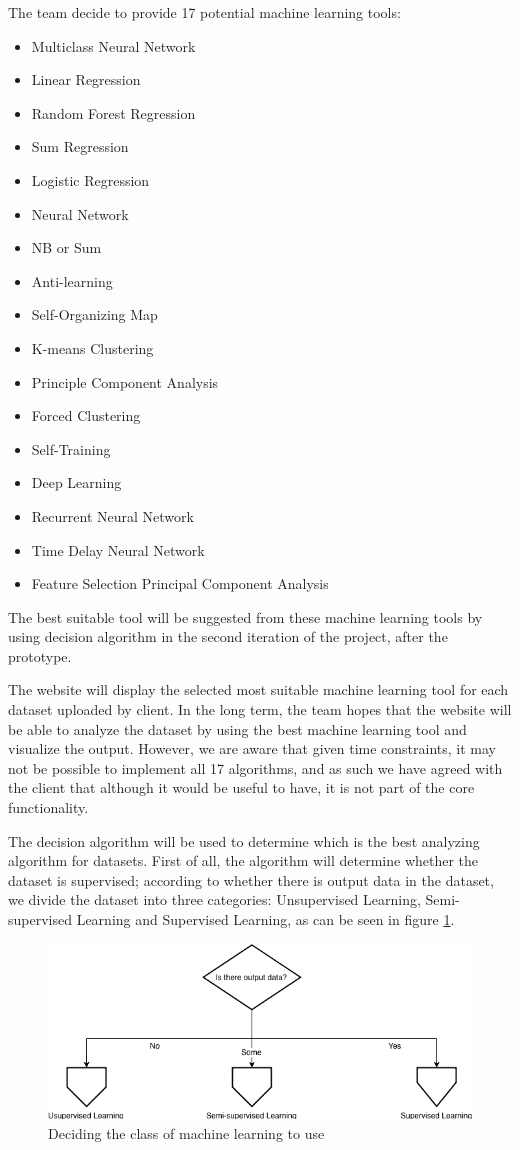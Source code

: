 \documentclass[titlepage]{article}
\begin{document}
The team decide to provide 17 potential machine learning tools:
\begin{itemize}
  \item Multiclass Neural Network
  \item Linear Regression
  \item Random Forest Regression
  \item Sum Regression
  \item Logistic Regression
  \item Neural Network
  \item NB or Sum
  \item Anti-learning
  \item Self-Organizing Map
  \item K-means Clustering
  \item Principle Component Analysis
  \item Forced Clustering
  \item Self-Training
  \item Deep Learning
  \item Recurrent Neural Network
  \item Time Delay Neural Network
  \item Feature Selection Principal Component Analysis
\end{itemize}
The best suitable tool will be suggested from these machine learning tools by using decision algorithm in the second iteration of the project, after the prototype.

The website will display the selected most suitable machine learning tool for each dataset uploaded by client. In the long term, the team hopes that the website will be able to analyze the dataset by using the best machine learning tool and visualize the output. However, we are aware that given time constraints, it may not be possible to implement all 17 algorithms, and as such we have agreed with the client that although it would be useful to have, it is not part of the core functionality.

The decision algorithm will be used to determine which is the best analyzing algorithm for datasets. First of all, the algorithm will determine whether the dataset is supervised; according to whether there is output data in the dataset, we divide the dataset into three categories: Unsupervised Learning, Semi-supervised Learning and Supervised Learning, as can be seen in figure \ref{main-decision}.

\begin{figure}[h!]
  \centering
  \includegraphics[width=\textwidth]{main-decision}
  \caption{Deciding the class of machine learning to use}
  \label{main-decision}
\end{figure}
\end{document}

